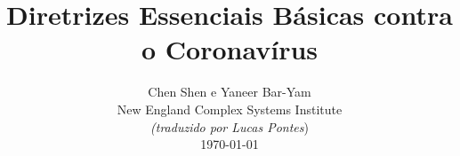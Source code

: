\documentclass[onecolumn,journal]{IEEEtran}
\begin{document}
\title{\color{Brown} Diretrizes Essenciais Básicas contra o Coronavírus \\
\vspace{-0.35ex}}
\author{Chen Shen e Yaneer Bar-Yam \\ New England Complex Systems Institute \\
\vspace{+0.35ex}
\small{\textit{(traduzido por Lucas Pontes})}\\
 \today
  \vspace{-14ex} \\


\bigskip
\bigskip

\textbf{}
 }

\maketitle


\flushbottom %



\thispagestyle{empty} %




\renewcommand{\thefootnote}{\fnsymbol{footnote}}
\end{document}
